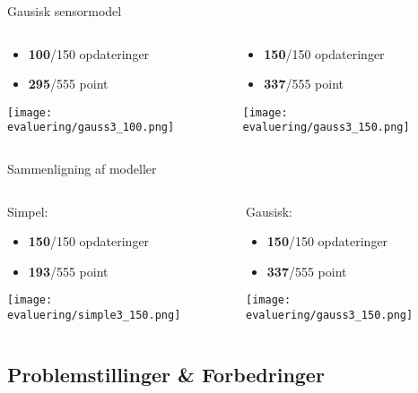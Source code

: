 \begin{frame}[fragile]{Gausisk sensormodel}
	\begin{columns}
		\begin{column}{0.5\textwidth}
			\begin{itemize}
			\item \textbf{100}/150 opdateringer
			\item \textbf{295}/555 point
			\end{itemize}
			\texttt{[image: evaluering/gauss3\_100.png]}
		\end{column}
		\begin{column}{0.5\textwidth}
			\begin{itemize}
			\item \textbf{150}/150 opdateringer
			\item \textbf{337}/555 point
			\end{itemize}
			\texttt{[image: evaluering/gauss3\_150.png]}
		\end{column}
\end{columns}
\end{frame}

\begin{frame}[fragile]{Sammenligning af modeller}
	\begin{columns}
		\begin{column}{0.5\textwidth}
			Simpel:
			\begin{itemize}
			\item \textbf{150}/150 opdateringer
			\item \textbf{193}/555 point
			\end{itemize}
			\texttt{[image: evaluering/simple3\_150.png]}
		\end{column}
		\begin{column}{0.5\textwidth}
			Gausisk:
			\begin{itemize}
			\item \textbf{150}/150 opdateringer
			\item \textbf{337}/555 point
			\end{itemize}
			\texttt{[image: evaluering/gauss3\_150.png]}
		\end{column}
\end{columns}
\end{frame}

\subsection{Problemstillinger \& Forbedringer}


